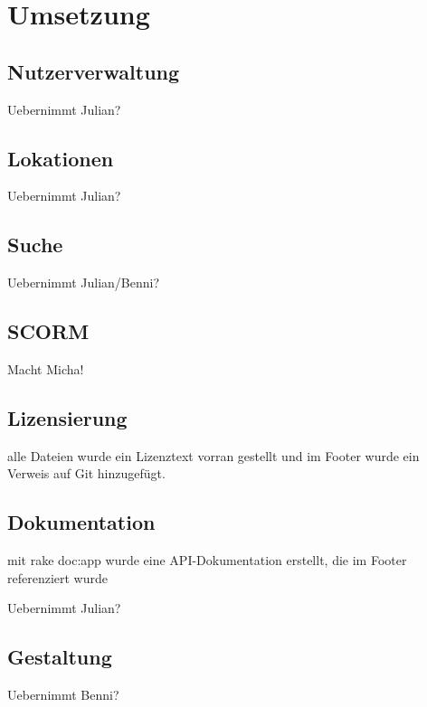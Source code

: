 \chapter{Umsetzung}\label{ref:chaptImplementation}

\section{Nutzerverwaltung}
\begin{k}
Uebernimmt Julian?
\end{k}

\section{Lokationen}
\begin{k}
Uebernimmt Julian?
\end{k}

\section{Suche}
\begin{k}
Uebernimmt Julian/Benni?
\end{k}

\section{SCORM}
\begin{k}
Macht Micha!
\end{k}

\section{Lizensierung}
\begin{k}
alle Dateien wurde ein Lizenztext vorran gestellt und im Footer wurde ein
Verweis auf Git hinzugefügt.
\end{k}

\section{Dokumentation}
\begin{k}
mit rake doc:app wurde eine API-Dokumentation erstellt, die im Footer
referenziert wurde

Uebernimmt Julian?
\end{k}

\section{Gestaltung}
\begin{k}
Uebernimmt Benni?
\end{k}